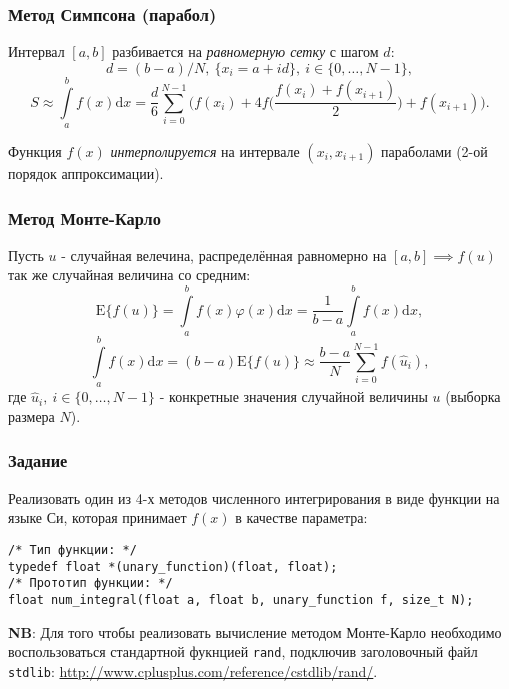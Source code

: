 \documentclass{beamer}
\begin{document}
    \begin{frame}[fragile]
        \frametitle{Метод Симпсона (парабол)}
        \justifying
        Интервал $[a, b]$ разбивается на {\it равномерную сетку} с шагом $d$: 
        $$d = (b - a) / N,\ \{x_{i} = a + id\},\ i \in \{0, \dotsc, N - 1\},$$
        $$S \approx \int\limits_{a}^{b} f(x) \textrm{d}x = \frac{d}{6}\sum_{i=0}^{N-1}\big(f(x_{i}) + 4f\Big(\frac{f(x_{i}) + f(x_{i+1})}{2}\Big) + f(x_{i + 1})\big).$$
        \par
        \justifying
        Функция $f(x)$ {\it интерполируется} на интервале $(x_{i}, x_{i+1})$ параболами (2-ой порядок аппроксимации).
    \end{frame}
    \begin{frame}[fragile]
        \frametitle{Метод Монте-Карло}
        \justifying
        Пусть $u$ - случайная велечина, распределённая равномерно на $[a, b] \implies f(u)$ так же случайная величина со средним:
        $$\textrm{E}\big\{f(u)\big\} = \int\limits_{a}^{b}f(x)\varphi(x)\textrm{d}x = \frac{1}{b-a}\int\limits_{a}^{b}f(x)\textrm{d}x,$$
        $$\int\limits_{a}^{b}f(x)\textrm{d}x = (b - a)\textrm{E}\big\{f(u)\big\} \approx \frac{b - a}{N}\sum_{i=0}^{N-1}f(\hat{u}_{i}),$$
        где $\hat{u}_{i},\ i \in \{0, \dotsc, N - 1\}$ - конкретные значения случайной величины $u$ (выборка размера $N$).
    \end{frame}
    \begin{frame}[fragile]
        \frametitle{Задание}
        \justifying
        Реализовать один из 4-х методов численного интегрирования в виде функции на языке Си, которая принимает $f(x)$ в качестве параметра:
        \begin{verbatim}
/* Тип функции: */
typedef float *(unary_function)(float, float);
/* Прототип функции: */
float num_integral(float a, float b, unary_function f, size_t N);
        \end{verbatim}
        \par
        \vspace{0.2cm}
        \justifying
        {\bf NB}: Для того чтобы реализовать вычисление методом Монте-Карло необходимо воспользоваться стандартной фукнцией {\tt rand}, подключив заголовочный файл {\tt stdlib}: \url{http://www.cplusplus.com/reference/cstdlib/rand/}.
    \end{frame}
\end{document}

